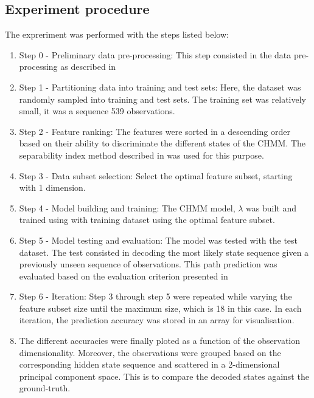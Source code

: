 \subsection{Experiment procedure}
The expreriment was performed with the steps listed below:
\begin{enumerate}
	\item Step 0 - Preliminary data pre-processing: This step consisted in the data pre-processing as described in %
	\item Step 1 - Partitioning data into training and test sets: Here, the dataset was randomly sampled into training and test sets. The training set was relatively small, it was a sequence 539 observations. 
	\item Step 2 -  Feature ranking: The features were sorted in a descending order based on their ability to discriminate the different states of the CHMM. The separability index method described in was used for this purpose. %
	\item Step 3 - Data subset selection: Select the optimal feature subset, starting with 1 dimension. 
	\item Step 4 - Model building and training: The CHMM model, \(\lambda\) was built and trained using with training dataset using the optimal feature subset.
	\item Step 5 - Model testing and evaluation: The model was tested with the test dataset. The test consisted in decoding the most likely state sequence given a previously unseen sequence of observations. This path prediction was evaluated based on the evaluation criterion presented in %
	\item Step 6 - Iteration: Step 3 through step 5 were repeated while varying the feature subset size until the maximum size, which is 18 in this case. In each iteration, the prediction accuracy was stored in an array for visualisation.
	\item The different accuracies were finally ploted as a function of the observation dimensionality. Moreover, the observations were grouped based on the corresponding hidden state sequence and scattered in a 2-dimensional principal component space. This is to compare the decoded states against the ground-truth.
\end{enumerate}

